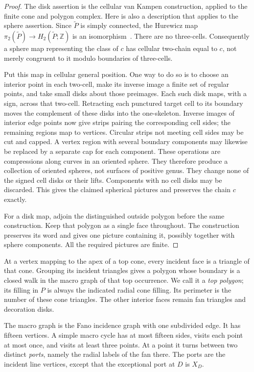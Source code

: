 \begin{proof}
The disk assertion is the cellular van Kampen construction, applied to
the finite cone and polygon complex.  Here is also a description that
applies to the sphere assertion.  Since $\widetilde P$ is simply
connected, the Hurewicz map
$\pi_2(\widetilde P)\longrightarrow H_2(\widetilde P;\mathbb Z)$ is an
isomorphism~\cite[Theorem~4.32]{Hatcher2002}.  There are no three-cells.
Consequently a sphere map
representing the class of $c$ has cellular two-chain equal to $c$, not
merely congruent to it modulo boundaries of three-cells.

Put this map in cellular general position.  One way to do so is to
choose an interior point in each two-cell, make its inverse image a
finite set of regular points, and take small disks about those
preimages.  Each such disk maps, with a sign, across that two-cell.
Retracting each punctured target cell to its boundary moves the
complement of these disks into the one-skeleton.  Inverse images of
interior edge points now give strips pairing the corresponding cell
sides; the remaining regions map to vertices.  Circular strips not
meeting cell sides may be cut and capped.  A vertex region with several
boundary components may likewise be replaced by a separate cap for
each component.  These operations are compressions along curves in an
oriented sphere.  They therefore produce a collection of oriented
spheres, not surfaces of positive genus.  They change none of the
signed cell disks or their lifts.  Components with no cell disks may
be discarded.  This gives the claimed spherical pictures and preserves
the chain $c$ exactly.

For a disk map, adjoin the distinguished outside polygon before the
same construction.  Keep that polygon as a single face throughout.
The construction preserves its word and gives one picture containing
it, possibly together with sphere components.  All the required
pictures are finite.
\end{proof}

At a vertex mapping to the apex of a top cone, every incident face is
a triangle of that cone.  Grouping its incident triangles gives a
polygon whose boundary is a closed walk in the macro graph of that top
occurrence.  We call it a \emph{top polygon}; its filling in $P$ is
always the indicated radial cone filling.  Its perimeter is the number
of these cone triangles.  The other interior faces remain fan triangles
and decoration disks.

The macro graph is the Fano incidence graph with one subdivided edge.
It has fifteen vertices.  A simple macro cycle has at most fifteen
sides, visits each point at most once, and visits at least three
points.  At a point it turns between two distinct \emph{ports}, namely
the radial labels of the fan there.  The ports are the incident line
vertices, except that the exceptional port at $D$ is $X_D$.

